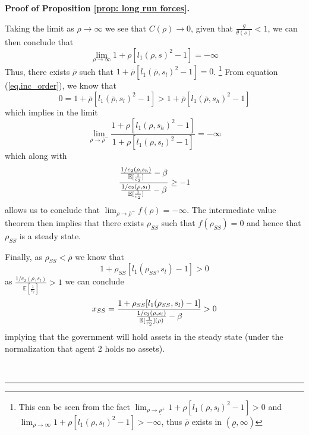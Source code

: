 \documentclass[thmsb,11pt]{article}
\newenvironment{proof}[1][Proof]{\noindent \textbf{#1.} }{\  \rule{0.5em}{0.5em}}
\begin{document}
\begin{proof}[Proof of Proposition \ref{prop: long run forces}]
\begin{description}
Taking the limit as $\rho\rightarrow\infty$ we see that $C(\rho)\rightarrow
0 $, given that $\frac g{\theta(s)} <1$, we can then conclude that
\begin{equation*}
\lim_{\rho\rightarrow\infty } 1+ \rho[l_1(\rho,s)^2-1] = -\infty
\end{equation*}
Thus, there exists $\overline \rho$ such that $1+\overline \rho[%
l_1(\overline \rho,s_l)^2-1] = 0$. \footnote{This can be seen from the fact $\lim_{\rho\rightarrow \underline
\rho^+} 1+\rho[l_1(\rho,s_l)^2 -1] > 0$ and $\lim_{\rho\rightarrow \infty } 1+\rho[l_1(\rho,s_l)^2 -1] > -\infty$, thus $\overline{\rho}$ exists in $(\underline{\rho},\infty)$ } From equation (\ref{eq.inc_order}), we
know that
\begin{equation*}
0 = 1+\overline \rho[l_1(\overline \rho,s_l)^2-1] > 1+\overline \rho[%
l_1(\overline \rho,s_h)^2-1]
\end{equation*}
which implies in the limit
\begin{equation*}
\lim_{\rho\rightarrow \overline \rho^-}\frac{1+\rho[l_1(\rho,s_h)^2-1]}{1+%
\rho[l_1(\rho,s_l)^2-1]} = -\infty
\end{equation*}
which along with
\begin{equation*}
\frac{\frac{1/c_2(\rho,s_h)}{\mathbb{E}[\frac1{c_2}]}-\beta }{\frac{%
1/c_2(\rho,s_l)}{\mathbb{E}[\frac1{c_2}]}-\beta} \geq -1
\end{equation*}
allows us to conclude that $\lim_{\rho\rightarrow \overline \rho^-} f(\rho)
= -\infty$. The intermediate value theorem then implies that there exists $%
\rho_{SS}$ such that $f(\rho_{SS}) = 0$ and hence that $\rho_{SS}$ is a
steady state.

Finally, as $\rho_{SS} < \overline \rho$ we know that
\begin{equation*}
1+\rho_{SS}[l_1(\rho_{SS},s_l)-1] >0
\end{equation*}%
as $\frac{1/c_2(\rho,s_l)}{\mathbb{E}[\frac1{c_2}]} >1$ we can
conclude
\begin{equation*}
x_{SS} = \frac{1+\rho_{SS}[l_1(\rho_{SS},s_l)-1]}{\frac{1/c_2(\rho,s_l)}{%
\mathbb{E}[\frac1{c_2}](\rho)}-\beta} >0
\end{equation*}%
implying that the government will hold assets in the steady state (under the
normalization that agent 2 holds no assets).


\end{description}
\end{proof}
\end{document}
